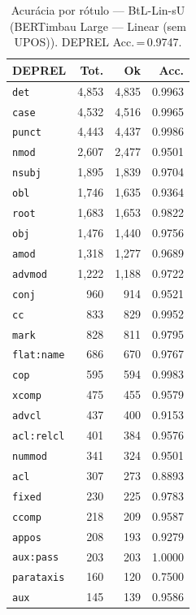 \begin{table}[ht]
\centering
\caption{Acurácia por rótulo --- BtL-Lin-sU (BERTimbau Large — Linear (sem UPOS)). DEPREL Acc.\,=\,0.9747.}
\label{tab:acc-predict-test-ablacao-linear-neuralmind-bert-large-portuguese-cased}
\scriptsize
\begin{tabular}{lrrr}
\toprule
\textbf{DEPREL} & \textbf{Tot.} & \textbf{Ok} & \textbf{Acc.} \\
\midrule
\texttt{det} & 4,853 & 4,835 & 0.9963 \\
\texttt{case} & 4,532 & 4,516 & 0.9965 \\
\texttt{punct} & 4,443 & 4,437 & 0.9986 \\
\texttt{nmod} & 2,607 & 2,477 & 0.9501 \\
\texttt{nsubj} & 1,895 & 1,839 & 0.9704 \\
\texttt{obl} & 1,746 & 1,635 & 0.9364 \\
\texttt{root} & 1,683 & 1,653 & 0.9822 \\
\texttt{obj} & 1,476 & 1,440 & 0.9756 \\
\texttt{amod} & 1,318 & 1,277 & 0.9689 \\
\texttt{advmod} & 1,222 & 1,188 & 0.9722 \\
\texttt{conj} & 960 & 914 & 0.9521 \\
\texttt{cc} & 833 & 829 & 0.9952 \\
\texttt{mark} & 828 & 811 & 0.9795 \\
\texttt{flat\!:\!name} & 686 & 670 & 0.9767 \\
\texttt{cop} & 595 & 594 & 0.9983 \\
\texttt{xcomp} & 475 & 455 & 0.9579 \\
\texttt{advcl} & 437 & 400 & 0.9153 \\
\texttt{acl\!:\!relcl} & 401 & 384 & 0.9576 \\
\texttt{nummod} & 341 & 324 & 0.9501 \\
\texttt{acl} & 307 & 273 & 0.8893 \\
\texttt{fixed} & 230 & 225 & 0.9783 \\
\texttt{ccomp} & 218 & 209 & 0.9587 \\
\texttt{appos} & 208 & 193 & 0.9279 \\
\texttt{aux\!:\!pass} & 203 & 203 & 1.0000 \\
\texttt{parataxis} & 160 & 120 & 0.7500 \\
\texttt{aux} & 145 & 139 & 0.9586 \\

\end{tabular}
\end{table}
